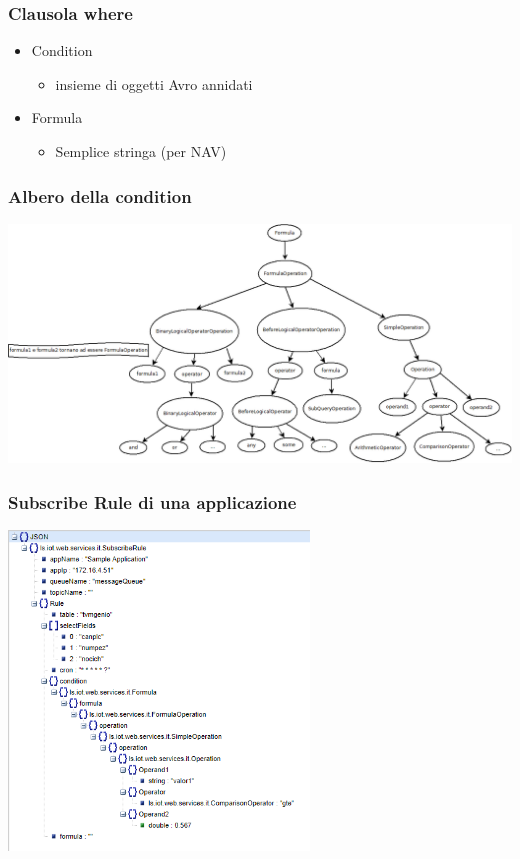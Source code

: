 \documentclass{beamer}
\begin{document}
\begin{frame}
\frametitle{Clausola where}
\begin{itemize}
\item Condition
\begin{itemize}
\item insieme di oggetti Avro annidati
\end{itemize}
\item Formula
\begin{itemize}
\item Semplice stringa (per NAV)
\end{itemize}
\end{itemize}
\end{frame}

\begin{frame}
\frametitle{Albero della condition}
\includegraphics[width=1\textwidth]{images/struttura-query-tree.png}
\end{frame}

\begin{frame}
\frametitle{Subscribe Rule di una applicazione}
\includegraphics[width=0.6\textwidth]{images/subscribe-json-1.png}
\end{frame}
\end{document}
